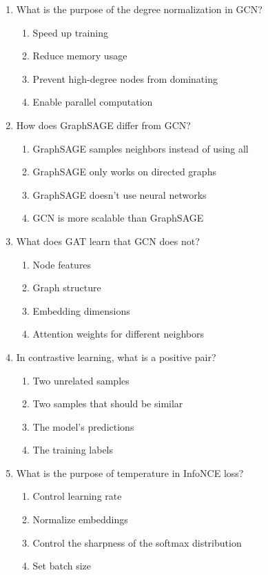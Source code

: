 \documentclass[12pt,a4paper]{article}
\begin{document}
\begin{enumerate}
\item What is the purpose of the degree normalization in GCN?
\begin{enumerate}[label=\Alph*)]
    \item Speed up training
    \item Reduce memory usage
    \item Prevent high-degree nodes from dominating
    \item Enable parallel computation
\end{enumerate}

\item How does GraphSAGE differ from GCN?
\begin{enumerate}[label=\Alph*)]
    \item GraphSAGE samples neighbors instead of using all
    \item GraphSAGE only works on directed graphs
    \item GraphSAGE doesn't use neural networks
    \item GCN is more scalable than GraphSAGE
\end{enumerate}

\item What does GAT learn that GCN does not?
\begin{enumerate}[label=\Alph*)]
    \item Node features
    \item Graph structure
    \item Embedding dimensions
    \item Attention weights for different neighbors
\end{enumerate}

\item In contrastive learning, what is a positive pair?
\begin{enumerate}[label=\Alph*)]
    \item Two unrelated samples
    \item Two samples that should be similar
    \item The model's predictions
    \item The training labels
\end{enumerate}

\item What is the purpose of temperature in InfoNCE loss?
\begin{enumerate}[label=\Alph*)]
    \item Control learning rate
    \item Normalize embeddings
    \item Control the sharpness of the softmax distribution
    \item Set batch size
\end{enumerate}


\end{enumerate}
\end{document}
